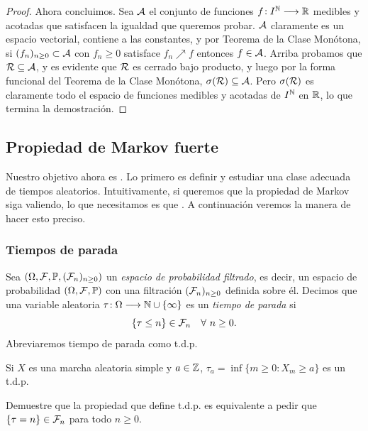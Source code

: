 \begin{proof}
Ahora concluimos.
Sea ${\cal A}$ el conjunto de funciones $f\!:I^{\mathbb{N}}\longrightarrow\mathbb{R}$ medibles y acotadas que satisfacen la igualdad que queremos probar.
${\cal A}$ claramente es un espacio vectorial, contiene a las constantes, y por Teorema de la Clase Monótona, si $(f_n)_{n\geq0}\subset{\cal A}$ con $f_n\geq0$ satisface $f_n\nearrow f$ entonces $f\in{\cal A}$.
Arriba probamos que ${\cal R}\subseteq{\cal A}$, y es evidente que ${\cal R}$ es cerrado bajo producto, y luego por la forma funcional del Teorema de la Clase Monótona, $\sigma({\cal R})\subseteq{\cal A}$.
Pero $\sigma({\cal R})$ es claramente todo el espacio de funciones medibles y acotadas de $I^{\mathbb{N}}$ en $\mathbb{R}$, lo que termina la demostración.
\end{proof}

\subsection{Propiedad de Markov fuerte}

Nuestro objetivo ahora es .
Lo primero es definir y estudiar una clase adecuada de tiempos aleatorios.
Intuitivamente, si queremos que la propiedad de Markov siga valiendo, lo que necesitamos es que .
A continuación veremos la manera de hacer esto preciso.

\subsubsection{Tiempos de parada}

\begin{defn} 
Sea $(\Omega,\mathcal{F},\mathbb{P},(\mathcal{F}_n)_{n\geq0})$ un \emph{espacio de probabilidad filtrado}, es decir, un espacio de probabilidad $(\Omega,\mathcal{F},\mathbb{P})$ con una filtración $(\mathcal{F}_n)_{n\geq0}$ definida sobre él.
Decimos que una variable aleatoria $\tau\!:\Omega\longrightarrow\mathbb{N}\cup\{\infty\}$ es un \emph{tiempo de parada} si
\[\{\tau\leq n\}\in\mathcal{F}_n\quad\forall~n\geq0.\]
Abreviaremos tiempo de parada como t.d.p.
\end{defn}

\begin{ex}\label{ex:taua}
Si $X$ es una marcha aleatoria simple y $a\in\mathbb{Z}$, $\tau_a=\inf\{m\geq0\!:X_m\geq a\}$ es un t.d.p.
\end{ex}

\begin{exer}
Demuestre que la propiedad que define t.d.p. es equivalente a pedir que $\{\tau=n\}\in\mathcal{F}_n$ para todo $n\geq0$.
\end{exer}

